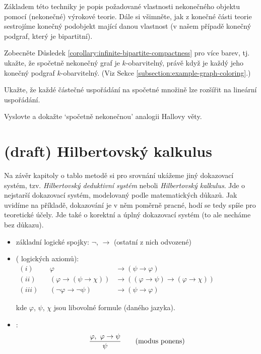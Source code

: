 Základem této techniky je popis požadované vlastnosti nekonečného objektu pomocí (nekonečné) výrokové teorie. Dále si všimněte, jak z konečné části teorie sestrojíme konečný podobjekt mající danou vlastnost (v našem případě konečný podgraf, který je bipartitní).

\begin{exercise}
    Zobecněte Důsledek \ref{corollary:infinite-bipartite-compactness} pro více barev, tj. ukažte, že spočetně nekonečný graf je $k$-obarvitelný, právě když je každý jeho konečný podgraf $k$-obarvitelný. (Viz Sekce \ref{subsection:example-graph-coloring}.)
\end{exercise}

\begin{exercise}
    Ukažte, že každé částečné uspořádání na spočetné množině lze rozšířit na lineární uspořádání.
\end{exercise}

\begin{exercise}
    Vyslovte a dokažte `spočetně nekonečnou' analogii Hallovy věty.
\end{exercise}

\section{(draft) Hilbertovský kalkulus}\label{section:hilbert-calculus-propositional}
\todo
Na závěr kapitoly o tablo metodě si pro srovnání ukážeme jiný dokazovací systém, tzv. \emph{Hilbertovský deduktivní systém} neboli \emph{Hilbertovský kalkulus}. Jde o nejstarší dokazovací systém, modelovaný podle matematických důkazů. Jak uvidíme na příkladě, dokazování je v něm poměrně pracné, hodí se tedy spíše pro teoretické účely. Jde také o korektní a úplný dokazovací systém (to ale necháme bez důkazu).


\begin{itemize}
    \item základní logické spojky: $\neg$, $\to$ (ostatní z nich odvozené)
    
    \item {} ( logických axiomů):
    \vspace{-2mm}\begin{align*}(i)& &\varphi &\to (\psi \to \varphi) \\
    (ii)& &(\varphi\to (\psi \to \chi))&\to ((\varphi \to \psi)\to(\varphi \to \chi))\qquad\qquad\qquad\qquad\phantom{\ } \\
    (iii)& &(\neg \varphi \to \neg \psi)&\to(\psi \to \varphi)
    \end{align*}
    
    \vspace{-2mm}
    kde $\varphi$, $\psi$, $\chi$ jsou libovolné formule (daného jazyka).
    \item {}:
    \vspace{-3mm}
    $$\frac{\varphi,\ \varphi \to \psi}{\psi}\qquad\text{{(modus ponens)}}$$
    \end{itemize}
    
